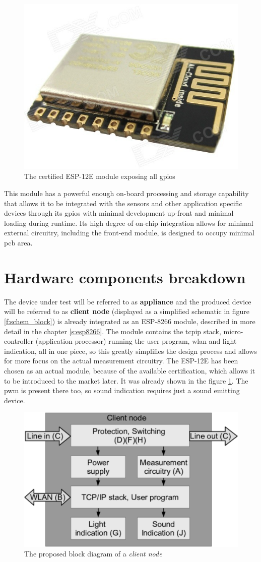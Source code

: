 \documentclass[journal]{IEEEtran}
\begin{document}
\begin{figure}[ht!]
\centering
\includegraphics[width=.4\linewidth,angle=0]{esp-12e}
\caption{The certified ESP-12E module exposing all \glspl{gpio}}\label{f:esp-12e}
\end{figure}

This module has a powerful enough on-board processing and storage capability that allows it to be integrated with the sensors and other application specific devices through its \glspl{gpio} with minimal development up-front and minimal loading during runtime. Its high degree of on-chip integration allows for minimal external circuitry, including the front-end module, is designed to occupy minimal \gls{pcb} area. 




\section{Hardware components breakdown} \label{ss:hw}
The device under test will be referred to as \textbf{appliance} and the produced device will be referred to as \textbf{client node} (displayed as a simplified schematic in figure \ref{f:schem_block}) is already integrated as an ESP-8266 module, described in more detail in the chapter \ref{s:esp8266}. The module contains the \gls{tcpip} stack, micro-controller (application processor) running the user program, \gls{wlan} and light indication, all in one piece, so this greatly simplifies the design process and allows for more focus on the actual measurement circuitry. The ESP-12E has been chosen as an actual module, because of the available certification\cite{online:2ADUIESP-12}, which allows it to be introduced to the market later. It was already shown in the figure \ref{f:esp-12e}. The \gls{pwm} is present there too, so sound indication requires just a sound emitting device.

\begin{figure}[ht!]
\centering
\includegraphics[width=.8\linewidth,angle=0]{client_node_diag}
\caption{The proposed block diagram of a \textit{client node}}\label{f:client_node}
\end{figure}
\end{document}
